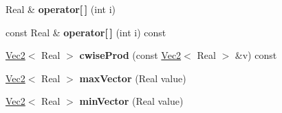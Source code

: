 \begin{DoxyCompactItemize}
\item 
\hypertarget{classhokusai_1_1Vec2_a852c058a70b775e7315b1da7c0721c83}{Real \& {\bfseries operator\mbox{[}$\,$\mbox{]}} (int i)}\label{classhokusai_1_1Vec2_a852c058a70b775e7315b1da7c0721c83}

\item 
\hypertarget{classhokusai_1_1Vec2_a2c27f45083b9b069c54b67c975a4fc40}{const Real \& {\bfseries operator\mbox{[}$\,$\mbox{]}} (int i) const }\label{classhokusai_1_1Vec2_a2c27f45083b9b069c54b67c975a4fc40}

\item 
\hypertarget{classhokusai_1_1Vec2_ae7aa0f618c03e4f2394b0fe9425ab610}{\hyperlink{classhokusai_1_1Vec2}{Vec2}$<$ Real $>$ {\bfseries cwise\+Prod} (const \hyperlink{classhokusai_1_1Vec2}{Vec2}$<$ Real $>$ \&v) const }\label{classhokusai_1_1Vec2_ae7aa0f618c03e4f2394b0fe9425ab610}

\item 
\hypertarget{classhokusai_1_1Vec2_a1e76dba30da1b8db44c546a1978143bb}{\hyperlink{classhokusai_1_1Vec2}{Vec2}$<$ Real $>$ {\bfseries max\+Vector} (Real value)}\label{classhokusai_1_1Vec2_a1e76dba30da1b8db44c546a1978143bb}

\item 
\hypertarget{classhokusai_1_1Vec2_af99fc405fac430e7f1c2b53d67fb3e76}{\hyperlink{classhokusai_1_1Vec2}{Vec2}$<$ Real $>$ {\bfseries min\+Vector} (Real value)}\label{classhokusai_1_1Vec2_af99fc405fac430e7f1c2b53d67fb3e76}

\end{DoxyCompactItemize}
